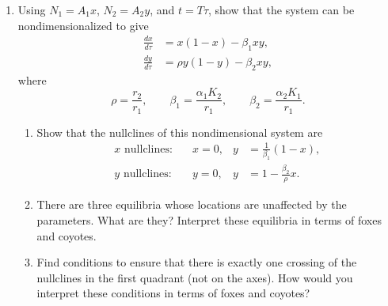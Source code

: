 \documentclass[12pt]{amsart}
\theoremstyle{conjecture}
\theoremstyle{definition}
\theoremstyle{question}
\theoremstyle{theorem}
\begin{document}
\begin{enumerate}[leftmargin=2em]
      \begin{enumerate}[label=(\alph*),leftmargin=2.2em]
        \item Using $N_1=A_1x$, $N_2=A_2y$, and $t=T\tau$, show that the
        system can be nondimensionalized to give
        \begin{align*}
            \frac{dx}{d\tau}&=x(1-x)-\beta_1xy,\\
            \frac{dy}{d\tau}&=\rho y(1-y)-\beta_2xy,
        \end{align*}
        where
        \[
            \rho=\frac{r_2}{r_1},
            \qquad
            \beta_1=\frac{\alpha_1K_2}{r_1},
            \qquad
            \beta_2=\frac{\alpha_2K_1}{r_1}.
        \]
        \begin{enumerate}[label=\roman*.,leftmargin=2em]
            \item Show that the nullclines of this nondimensional system are
            \begin{align*}
                x\text{ nullclines:}&\quad x=0,
                &y&=\frac{1}{\beta_1}(1-x),\\
                y\text{ nullclines:}&\quad y=0,
                &y&=1-\frac{\beta_2}{\rho}x.
            \end{align*}
            \item There are three equilibria whose locations are unaffected by the
            parameters. What are they? Interpret these equilibria in terms of
            foxes and coyotes.
            \item Find conditions to ensure that there is exactly one crossing of
            the nullclines in the first quadrant (not on the axes). How would you
            interpret these conditions in terms of foxes and coyotes?
        \end{enumerate}


\end{enumerate}
\end{enumerate}
\end{document}
